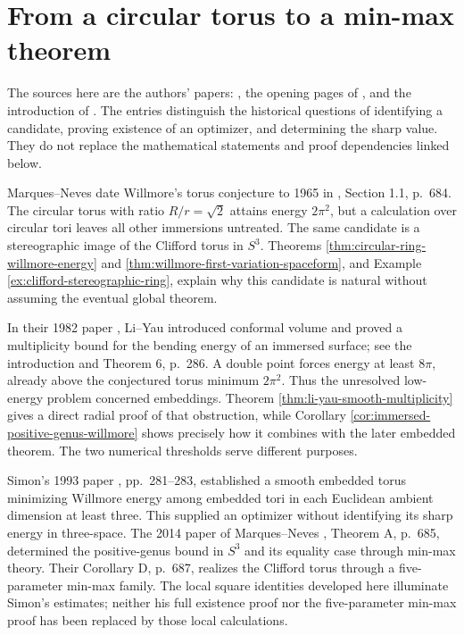 \chapter{From a circular torus to a min-max theorem}\label{sec:history-willmore-development}
The sources here are the authors' papers: \cite{LY82}, the opening pages of \cite{SimW93}, and the introduction of \cite{MNWill}. The entries distinguish the historical questions of identifying a candidate, proving existence of an optimizer, and determining the sharp value. They do not replace the mathematical statements and proof dependencies linked below.

\begin{remark}\label{rem:history-willmore-circular-candidate}
Marques--Neves date Willmore's torus conjecture to 1965 in \cite{MNWill}, Section 1.1, p.~684. The circular torus with ratio $R/r=\sqrt2$ attains energy $2\pi^2$, but a calculation over circular tori leaves all other immersions untreated. The same candidate is a stereographic image of the Clifford torus in $S^3$. Theorems \ref{thm:circular-ring-willmore-energy} and \ref{thm:willmore-first-variation-spaceform}, and Example \ref{ex:clifford-stereographic-ring}, explain why this candidate is natural without assuming the eventual global theorem.
\end{remark}

\begin{remark}\label{rem:history-li-yau-multiplicity}
In their 1982 paper \cite{LY82}, Li--Yau introduced conformal volume and proved a multiplicity bound for the bending energy of an immersed surface; see the introduction and Theorem 6, p.~286. A double point forces energy at least $8\pi$, already above the conjectured torus minimum $2\pi^2$. Thus the unresolved low-energy problem concerned embeddings. Theorem \ref{thm:li-yau-smooth-multiplicity} gives a direct radial proof of that obstruction, while Corollary \ref{cor:immersed-positive-genus-willmore} shows precisely how it combines with the later embedded theorem. The two numerical thresholds serve different purposes.
\end{remark}

\begin{remark}\label{rem:history-willmore-existence-value}
Simon's 1993 paper \cite{SimW93}, pp.~281--283, established a smooth embedded torus minimizing Willmore energy among embedded tori in each Euclidean ambient dimension at least three. This supplied an optimizer without identifying its sharp energy in three-space. The 2014 paper of Marques--Neves \cite{MNWill}, Theorem A, p.~685, determined the positive-genus bound in $S^3$ and its equality case through min-max theory. Their Corollary D, p.~687, realizes the Clifford torus through a five-parameter min-max family. The local square identities developed here illuminate Simon's estimates; neither his full existence proof nor the five-parameter min-max proof has been replaced by those local calculations.
\end{remark}
